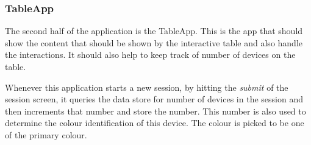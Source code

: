 \subsubsection{TableApp} \label{tableapp}

The second half of the application is the TableApp. This is the app that should show the content that should be shown by the interactive table and also handle the interactions. It should also help to keep track of number of devices on the table.

Whenever this application starts a new session, by hitting the \emph{submit} of the session screen, it queries the data store for number of devices in the session and then increments that number and store the number. This number is also used to determine the colour identification of this device. The colour is picked to be one of the primary colour.


